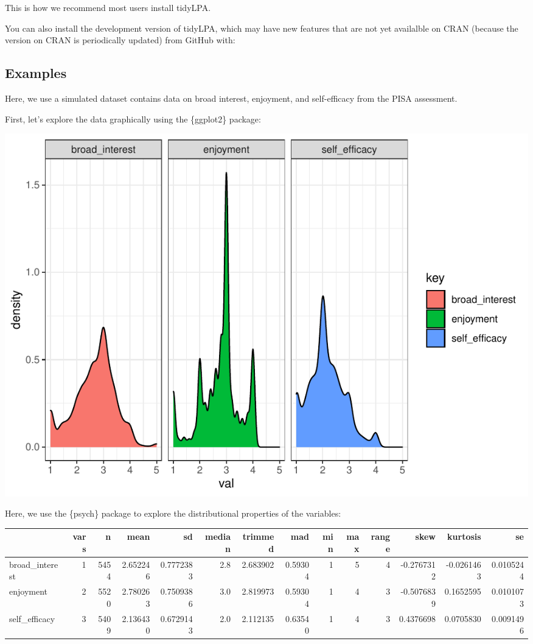 \documentclass[man]{apa6}
\begin{document}
This is how we recommend most users install tidyLPA.

You can also install the development version of tidyLPA, which may have new features that are not yet availalble on CRAN (because the version on CRAN is periodically updated) from GitHub with:

\hypertarget{examples}{%
\subsection{Examples}\label{examples}}

Here, we use a simulated dataset contains data on broad interest, enjoyment, and self-efficacy from the PISA assessment.

First, let's explore the data graphically using the \{ggplot2\} package:

\includegraphics{paper_files/figure-latex/unnamed-chunk-7-1.pdf}

Here, we use the \{psych\} package to explore the distributional properties of the variables:

\begin{tabular}{l|r|r|r|r|r|r|r|r|r|r|r|r|r}
\hline
  & vars & n & mean & sd & median & trimmed & mad & min & max & range & skew & kurtosis & se\\
\hline
broad\_interest & 1 & 5454 & 2.652246 & 0.7772383 & 2.8 & 2.683902 & 0.59304 & 1 & 5 & 4 & -0.2767312 & -0.0261463 & 0.0105244\\
\hline
enjoyment & 2 & 5520 & 2.780263 & 0.7509386 & 3.0 & 2.819973 & 0.59304 & 1 & 4 & 3 & -0.5076839 & 0.1652595 & 0.0101073\\
\hline
self\_efficacy & 3 & 5409 & 2.136430 & 0.6729143 & 2.0 & 2.112135 & 0.63540 & 1 & 4 & 3 & 0.4376698 & 0.0705830 & 0.0091496\\
\hline
\end{tabular}
\end{document}
